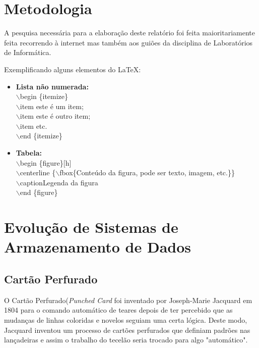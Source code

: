 \documentclass{report}
\begin{document}
\chapter{Metodologia}
\label{chap.metodologia}
	A pesquisa necessária para a elaboração deste relatório foi feita maioritariamente feita recorrendo à internet mas também aos guiões da disciplina de Laboratórios de Informática.
	
	Exemplificando alguns elementos do \LaTeX :
	\begin{itemize}
 		\item \textbf{Lista não numerada:} \\
			$\backslash$begin \{{itemize}\} \\			
				$\backslash$item  este é um item; \\ 				
				$\backslash$item  este é outro item; \\
				$\backslash$item  etc. \\
			$\backslash$end \{{itemize}\} 	\\	
 		 
 		\item \textbf{Tabela:}  \\
 			$\backslash$begin \{{figure}\}[h] \\
	 			$\backslash$centerline \{{$\backslash$fbox\{{Conteúdo da figura, pode ser texto, imagem, etc.}}\}\} \\
 				$\backslash$caption{Legenda da figura} \\
 			$\backslash$end \{{figure}\}
	
 	\end{itemize} 
	

\newpage

\chapter{Evolução de Sistemas de Armazenamento de Dados}
\label{chap.evolucao}
	\section{Cartão Perfurado}	
		
		O Cartão Perfurado(\textit{Punched Card} foi inventado por Joseph-Marie Jacquard em 1804 para o comando automático de teares depois de ter percebido que as mudanças de linhas coloridas e novelos  seguiam uma certa lógica. Deste modo, Jacquard inventou um processo de cartões perfurados que definiam padrões nas lançadeiras e assim o trabalho do tecelão seria trocado para algo "automático". 
		
\end{document}
